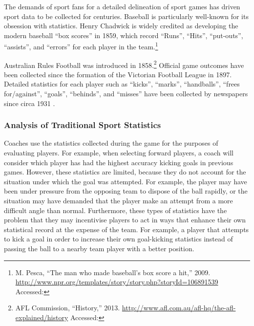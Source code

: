 The demands of sport fans for a detailed delineation of sport games
has driven sport data to be collected for centuries. Baseball is
particularly well-known for its obsession with statistics. Henry
Chadwick is widely credited as developing the modern baseball ``box
scores'' in 1859, which record ``Runs'', ``Hits'', ``put-outs'',
``assists'', and ``errors'' for each player in the team.\footnote{M.
  Pesca, ``The man who made baseball's box score a hit,'' 2009.
  \url{http://www.npr.org/templates/story/story.php?storyId=106891539}
  Accessed: }

Australian Rules Football was introduced in 1858.\footnote{AFL Commission,
  ``History,'' 2013.
  \url{http://www.afl.com.au/afl-hq/the-afl-explained/history} Accessed: } Official game outcomes have been collected since the
formation of the Victorian Football League in 1897. Detailed statistics
for each player such as ``kicks'', ``marks'', ``handballs'', ``frees
for/against'', ``goals'', ``behinds'', and ``misses'' have been
collected by newspapers since circa 1931
\cite{hopkins_pre-computer_2011}.

\subsubsection{Analysis of Traditional Sport
Statistics}\label{analysis-of-traditional-sport-statistics}

Coaches use the statistics collected during the game for the purposes of
evaluating players. For example, when selecting forward players, a coach
will consider which player has had the highest accuracy kicking goals in
previous games. However, these statistics are limited, because they do
not account for the situation under which the goal was attempted. For
example, the player may have been under pressure from the opposing team
to dispose of the ball rapidly, or the situation may have demanded that
the player make an attempt from a more difficult angle than normal.
Furthermore, these types of statistics have the problem that they may
incentivise players to act in ways that enhance their own statistical
record at the expense of the team. For example, a player that attempts
to kick a goal in order to increase their own goal-kicking statistics
instead of passing the ball to a nearby team player with a better
position.


